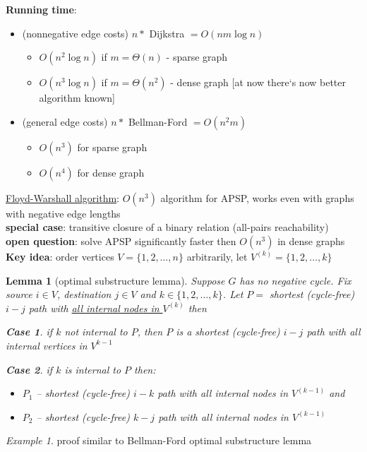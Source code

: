 \documentclass[a4paper,12pt]{article}
\theoremstyle{plain}
\newtheorem*{lemma}{Lemma}
\theoremstyle{definition}
\newtheorem{case}{Case}[subsection]
\theoremstyle{remark}
\newtheorem*{example}{Example}
\begin{document}
\textbf{Running time}:
\begin{itemize}
	\item (nonnegative edge costs) $n *$ Dijkstra $= O(nm \log n)$
	\begin{itemize}
		\item $O(n^2 \log n)$ if $m = \Theta(n)$ - sparse graph
		\item $O(n^3 \log n)$ if $m = \Theta(n^2)$ - dense graph [at now there`s now better algorithm known]
	\end{itemize}
	\item (general edge costs) $n *$ Bellman-Ford $= O(n^2 m)$
	\begin{itemize}
		\item $O(n^3)$ for sparse graph
		\item $O(n^4)$ for dense graph
	\end{itemize}
\end{itemize}

\underline{Floyd-Warshall algorithm}: $O(n^3)$ algorithm for APSP, works even with graphs with negative edge lengths
\\

\textbf{special case}: transitive closure of a binary relation (all-pairs reachability)
\\

\textbf{open question}: solve APSP significantly faster then $O(n^3)$ in dense graphs
\\

\textbf{Key idea}: order vertices $V = \{1, 2, \dots, n\}$ arbitrarily, let $V^{(k)} = \{1, 2, \dots, k\}$

\begin{lemma}[optimal substructure lemma] Suppose $G$ has no negative cycle. Fix source $i \in V$, destination $j \in V$ and $k \in \{1, 2, \dots, k\}$. Let $P =$ shortest (cycle-free) $i-j$ path with \underline{all internal nodes in $V^{(k)}$} then
\begin{case}if $k$ not internal to $P$, then $P$ is a shortest (cycle-free) $i-j$ path with all internal vertices in $V^{k-1}$\end{case}
\begin{case}if $k$ is internal to $P$ then:
\begin{itemize}
	\item $P_1$ -- shortest (cycle-free) $i-k$ path with all internal nodes in $V^{(k-1)}$ and
	\item $P_2$ -- shortest (cycle-free) $k-j$ path with all internal nodes in $V^{(k-1)}$
\end{itemize}
\end{case}
\end{lemma}
\begin{example}proof similar to Bellman-Ford optimal substructure lemma\end{example}
\end{document}
